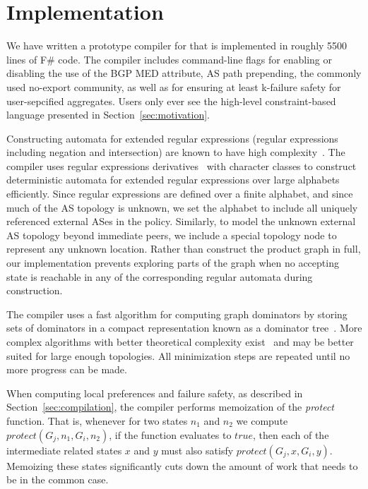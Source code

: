 \section{Implementation}
\label{sec:implementation}

We have written a prototype compiler for \sysname that is implemented in roughly 5500 lines of F\# code. The compiler includes command-line flags for enabling or disabling the use of the BGP MED attribute, AS path prepending, the commonly used no-export community, as well as for ensuring at least k-failure safety for user-sepcified aggregates. Users only ever see the high-level constraint-based language presented in Section~\ref{sec:motivation}.


Constructing automata for extended regular expressions (regular expressions including negation and intersection) are known to have high complexity~\cite{regex-complexity}. The \sysname compiler uses regular expressions derivatives~\cite{regex-derivatives} with character classes to construct deterministic automata for extended regular expressions over large alphabets efficiently. Since regular expressions are defined over a finite alphabet, and since much of the AS topology is unknown, we set the alphabet to include all uniquely referenced external ASes in the policy. Similarly, to model the unknown external AS topology beyond immediate peers, we include a special topology node to represent any unknown location.
%
Rather than construct the product graph in full, our implementation prevents exploring parts of the graph when no accepting state is reachable in any of the corresponding regular automata during construction.


The \sysname compiler uses a fast algorithm for computing graph dominators by storing sets of dominators in a compact representation known as a dominator tree~\cite{fast-dominance}. More complex algorithms with better theoretical complexity exist~\cite{linear-dominance, tarjan-dominance} and may be better suited for large enough topologies. All minimization steps are repeated until no more progress can be made.


When computing local preferences and failure safety, as described in Section~\ref{sec:compilation}, the compiler performs memoization of the \textit{protect} function. That is, whenever for two states $n_1$ and $n_2$ we compute $protect(G_j, n_1, G_i, n_2)$, if the function evaluates to $true$, then each of the intermediate related states $x$ and $y$ must also satisfy $protect(G_j, x, G_i, y)$. Memoizing these states significantly cuts down the amount of work that needs to be in the common case.

